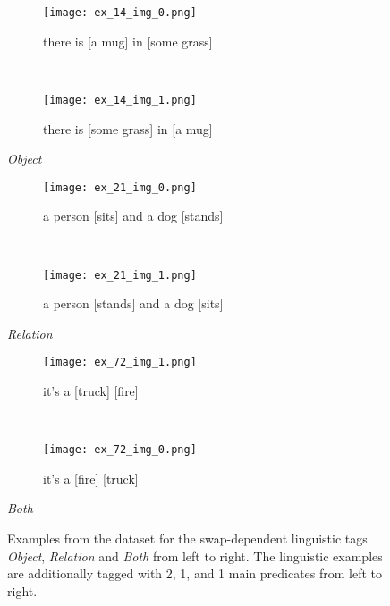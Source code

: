 \begin{figure}
\centering
    \begin{minipage}[t]{.30\textwidth}
        \begin{subfigure}[t]{\textwidth}
        \centering
        \texttt{[image: ex\_14\_img\_0.png]}
        \caption{there is [a mug] in [some grass]}
        \end{subfigure}\\
        \begin{subfigure}[t]{\textwidth}
        \centering
        \texttt{[image: ex\_14\_img\_1.png]}
        \caption{there is [some grass] in [a mug]}
        \end{subfigure}%
        \caption*{\textit{Object}}
    \end{minipage}
    \hfill
    \begin{minipage}[t]{.30\textwidth}
        \begin{subfigure}[t]{\textwidth}
        \centering
        \texttt{[image: ex\_21\_img\_0.png]}
        \caption{a person [sits] and a dog [stands]}
        \end{subfigure}\\
        \begin{subfigure}[t]{\textwidth}
        \centering
        \texttt{[image: ex\_21\_img\_1.png]}
        \caption{a person [stands] and a dog [sits]}
        \end{subfigure}%
        \caption*{\textit{Relation}}
    \end{minipage}
    \hfill
    \begin{minipage}[t]{.30\textwidth}
        \begin{subfigure}[t]{\textwidth}
        \centering
        \texttt{[image: ex\_72\_img\_1.png]}
        \caption{it's a [truck] [fire]}
        \end{subfigure}\\
        \begin{subfigure}[t]{\textwidth}
        \centering
        \texttt{[image: ex\_72\_img\_0.png]}
        \caption{it's a [fire] [truck]}
        \end{subfigure}%
        \caption*{\textit{Both}}
    \end{minipage}%
    \caption[]{Examples from the dataset for the swap-dependent linguistic tags \textit{Object}, \textit{Relation} and \textit{Both} from left to right. The linguistic examples are additionally tagged with 2, 1, and 1 main predicates from left to right.}
    \label{fig:dataset-examples-linguistic}
\end{figure}

